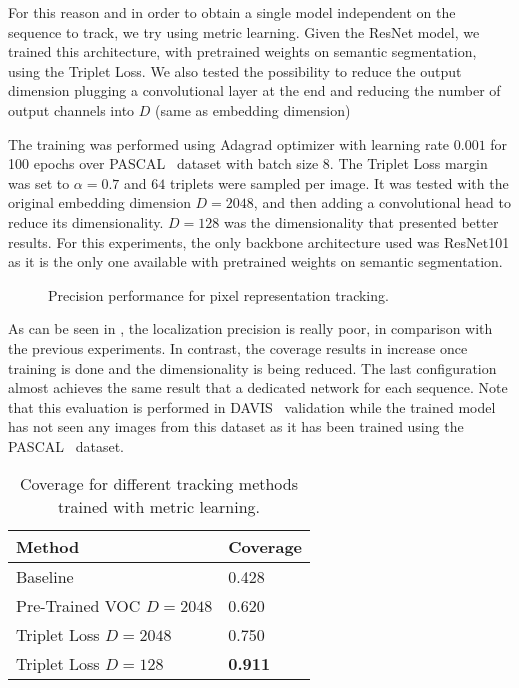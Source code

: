For this reason and in order to obtain a single model independent on the sequence to track, we try using metric learning.
Given the ResNet model, we trained this architecture, with pretrained weights on semantic segmentation, using the Triplet Loss.
We also tested the possibility to reduce the output dimension plugging a convolutional layer at the end and reducing the number of output channels into $D$ (same as embedding dimension)

The training was performed using Adagrad optimizer with learning rate $0.001$ for 100 epochs over PASCAL~\pascal{} dataset with batch size $8$.
The Triplet Loss margin was set to $\alpha = 0.7$ and $64$ triplets were sampled per image.
It was tested with the original embedding dimension $D=2048$, and then adding a convolutional head to reduce its dimensionality.
$D=128$ was the dimensionality that presented better results.
For this experiments, the only backbone architecture used was ResNet101 as it is the only one available with pretrained weights on semantic segmentation.


\begin{figure}[h]
  \centering
  
  \caption{Precision performance for pixel representation tracking.}
  \label{fig:experiments:tracking:metriclearning}
\end{figure}

As can be seen in , the localization precision is really poor, in comparison with the previous experiments.
In contrast, the coverage results in  increase once training is done and the dimensionality is being reduced. The last configuration almost achieves the same result that a dedicated network for each sequence.
Note that this evaluation is performed in DAVIS~\davislast{} validation while the trained model has not seen any images from this dataset as it has been trained using the PASCAL~\pascal{} dataset.


\begin{table}[h]
  \centering
  \begin{tabular}{l|l}
    \toprule
    Method                   & Coverage       \\
    \midrule
    Baseline                 & 0.428          \\
    Pre-Trained VOC $D=2048$ & 0.620          \\
    Triplet Loss $D=2048$    & 0.750          \\
    Triplet Loss $D=128$     & \textbf{0.911} \\
    \bottomrule
  \end{tabular}
  \caption{Coverage for different tracking methods trained with metric learning. }
  \label{tab:experiments:tracking:coveragemetriclearning}
\end{table}

